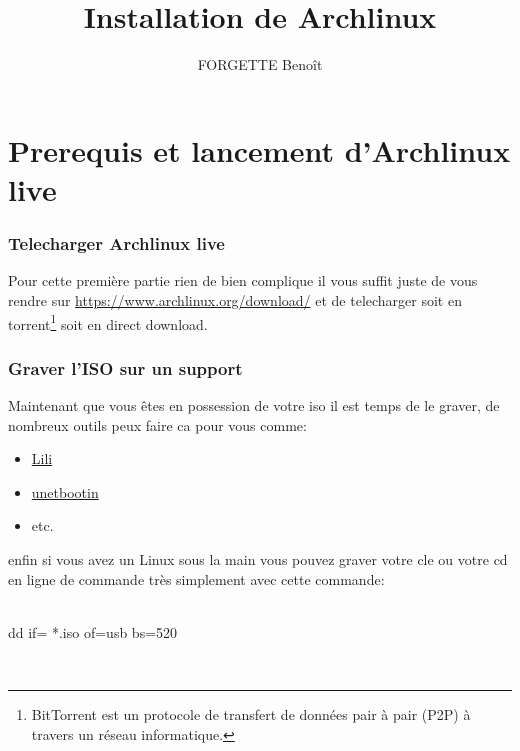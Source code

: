 \documentclass[a4paper]{book}
\newenvironment{codebox}{
  \itshape
  \small
  \\
  \begin{lrbox}{
      \mybox
    }
    \begin{minipage}{1\textwidth}}{
      \end{minipage}
    \end{lrbox}
    \fcolorbox{black}{lightgray}{\usebox{\mybox}}
    \\
  }
\begin{document}
  \title{Installation de Archlinux}
  \author{FORGETTE Benoît}
  \maketitle


  \tableofcontents
  \part{Prerequis et lancement d'Archlinux live}
  \section{Telecharger Archlinux live}
  Pour cette première partie rien de bien complique il vous suffit juste de
  vous rendre sur \url{https://www.archlinux.org/download/} et de telecharger
  soit en torrent\footnote{BitTorrent est un protocole de transfert de données 
  pair à pair (P2P) à travers un réseau informatique.}
  soit en direct download.
  \section{Graver l'ISO sur un support}
  Maintenant que vous êtes en possession de votre iso il est temps de le
  graver, de nombreux outils peux faire ca pour vous comme\@:
  \begin{itemize} 
    \item \href{http://www.linuxliveusb.com/fr/download}{Lili}
    \item \href{https://unetbootin.github.io/}{unetbootin}
    \item etc.
  \end{itemize}
  enfin si vous avez un Linux sous la main vous pouvez graver votre cle ou
  votre cd en ligne de commande très simplement avec cette commande\@:\\
  \begin{codebox}
    dd if= *.iso of=usb bs=520
  \end{codebox}
\end{document}
